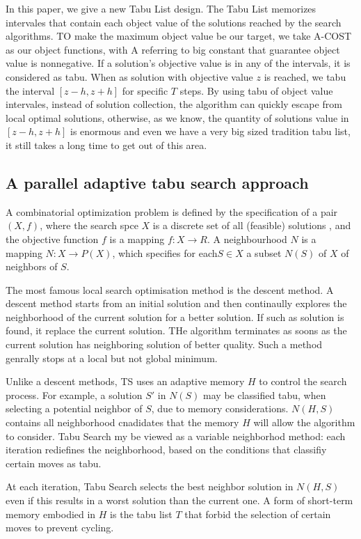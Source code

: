 In this paper, we give a new Tabu List design. The Tabu List memorizes intervales that contain each object value of the solutions reached by the search algorithms. TO make the maximum object value be our target, we take A-COST as our object functions, with A referring to big constant that guarantee object value is nonnegative. If a solution's objective value is in any of the intervals, it is considered as tabu. When as solution with objective value $z$ is reached, we tabu the interval $[z-h,z+h]$ for specific $T$ steps. By using tabu of object value intervales, instead of solution collection, the algorithm can quickly escape from local optimal solutions, otherwise, as we know, the quantity of solutions value in $[z-h,z+h]$ is enormous and even we have a very big sized tradition tabu list, it still takes a long time to get out of this area.

\subsection{A parallel adaptive tabu search approach}
A combinatorial optimization problem is defined by the specification of a pair $(X,f)$, where the search spce $X$ is a discrete set of all (feasible) solutions , and the objective function $f$ is a mapping $f \colon X \rightarrow R$. A neighbourhood $N$ is a mapping $N \colon X \rightarrow P(X)$, which specifies for each$S \in X$ a subset $N(S)$ of $X$ of neighbors of $S$.

 The most famous local search optimisation method is the descent method. A descent method starts from an initial solution and then continaully explores the neighborhood of the current solution for a better solution. If such as solution is found, it replace the current solution. THe algorithm terminates as soons as the current solution has neighboring solution of better quality. Such a method genrally stops at a local but not global minimum.

 Unlike a descent methods, TS uses an adaptive memory $H$ to control the search process. For example, a solution $S'$ in $N(S)$ may be classified tabu, when selecting a potential neighbor of $S$, due to memory considerations. $N(H,S)$ contains all neighborhood cnadidates that the memory $H$ will allow the algorithm to consider. Tabu Search my be viewed as a variable neighborhod method: each iteration rediefines the neighborhood, based on the conditions that classifiy certain moves as tabu.

 At each iteration, Tabu Search selects the best neighbor solution in $N(H,S)$ even if this results in a worst solution than the current one. A form of short-term memory embodied in $H$ is the tabu list $T$ that forbid the selection of certain moves to prevent cycling.

